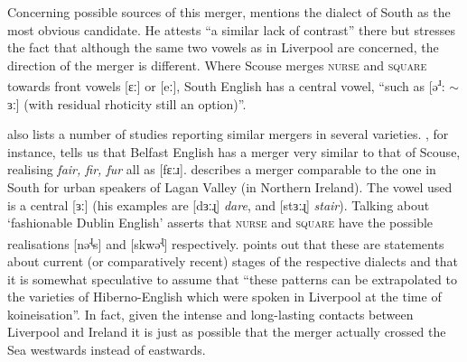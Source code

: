 Concerning possible sources of this merger, \citet[128]{honeybone2007} mentions the dialect of South  as the most obvious candidate.
He attests ``a similar lack of contrast'' there but stresses the fact that although the same two vowels as in Liverpool are concerned, the direction of the merger is different.
Where Scouse merges \textsc{nurse} and \textsc{square} towards front vowels [ɛː] or [eː], South  English has a central vowel, ``such as [ə\textsuperscript{ɹ}: \(\sim\) ɜː] (with residual rhoticity still an option)''.

\parencite{honeybone2007} also lists a number of studies reporting similar mergers in several  varieties.
\citet{wells1982}, for instance, tells us that Belfast English has a merger very similar to that of Scouse, realising \emph{fair, fir, fur} all as [fɛːɹ].
\citet[cf.][48]{harris1985} describes a merger comparable to the one in South  for urban speakers of Lagan Valley (in Northern Ireland).
The vowel used is a central [ɜː] (his examples are [dɜːɻ] \emph{dare}, and [stɜːɻ] \emph{stair}).
Talking about `fashionable Dublin English' \citet{hickey1999} asserts that \textsc{nurse} and \textsc{square} have the possible realisations [nə\textsuperscript{ɻ}s] and [skwə\textsuperscript{ɻ}] respectively.
\parencite[128]{honeybone2007} points out that these are statements about current (or comparatively recent) stages of the respective dialects and that it is somewhat speculative to assume that ``these patterns can be extrapolated to the varieties of Hiberno-English which were spoken in Liverpool at the time of koineisation''.
In fact, given the intense and long-lasting contacts between Liverpool and Ireland it is just as possible that the merger actually crossed the  Sea westwards instead of eastwards.

